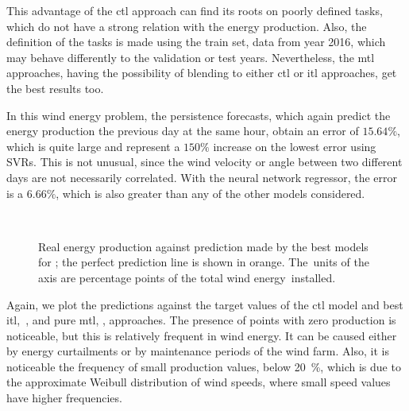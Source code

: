 %
This advantage of the \acrshort{ctl} approach can find its roots on poorly defined tasks, which do not have a strong relation with the energy production. Also, the definition of the tasks is made using the train set, data from year 2016, which may behave differently to the validation or test years.
Nevertheless, the \acrshort{mtl} approaches, having the possibility of blending to either \acrshort{ctl} or \acrshort{itl} approaches, get the best results too.

%
In this wind energy problem, the persistence forecasts, which again predict the energy production the previous day at the same hour, obtain an error of $15.64\%$, which is quite large and represent a $150\%$ increase on the lowest error using SVRs. This is not unusual, since the wind velocity or angle between two different days are not necessarily correlated.
%
With the neural network regressor, the error is a $6.66\%$, which is also greater than any of the other models considered.

\begin{figure}[t!]
    \centering%
    \quad%
    \quad%
    \\
 \caption{\label{fig:stv_best_plots} Real energy production against prediction made by the best models for ; the perfect prediction line is shown in orange. The~units of the axis are percentage points of the total wind energy~installed.}
 \end{figure}

%
Again, we plot the predictions against the target values of the \acrshort{ctl} model and best \acrshort{itl},~, and pure \acrshort{mtl}, , approaches.
The presence of points with zero production is noticeable, but this is relatively frequent in wind energy. It can be caused either by energy curtailments or by maintenance periods of the wind farm.
Also, it is noticeable the frequency of small production values, below \SI{20}{\percent}, which is due to the approximate Weibull distribution of wind speeds, where small speed values have higher frequencies. 







